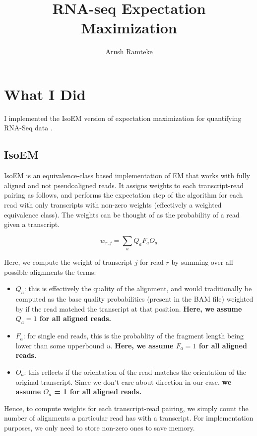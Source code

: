 \documentclass{article}
\title{RNA-seq Expectation Maximization}
\date{}
\author{Arush Ramteke}
\begin{document}
\maketitle

\section*{What I Did}

I implemented the IsoEM version of expectation maximization for quantifying RNA-Seq data \cite{nicolae}.

\subsection*{IsoEM}

IsoEM is an equivalence-class based implementation of EM that works with fully aligned and not pseudoaligned reads.
It assigns weights to each transcript-read pairing as follows, and performs the expectation step of the algorithm for each read with only transcripts with non-zero weights (effectively a weighted equivalence class). The weights can be thought of as the probability of a read given a transcript.

$$ w_{r,j} = \sum_{a}Q_aF_aO_a$$

Here, we compute the weight of transcript $j$ for read $r$ by summing over all possible alignments the terms:
\begin{itemize}
    \item{$Q_a$: this is effectively the quality of the alignment, and would traditionally be computed as the base quality probabilities (present in the BAM file) weighted by if the read matched the transcript at that position. \textbf{Here, we assume $Q_a = 1$ for all aligned reads.}}
    \item{$F_a$: for single end reads, this is the probablity of the fragment length being lower than some upperbound $u$. \textbf{Here, we assume $F_a = 1$ for all aligned reads.}}
    \item {$O_a$: this reflects if the orientation of the read matches the orientation of the original transcript. Since we don't care about direction in our case, \textbf{we assume $O_a$ = 1 for all aligned reads.}}
\end{itemize}

Hence, to compute weights for each transcript-read pairing, we simply count the number of alignments a particular read has with a transcript. For implementation purposes, we only need to store non-zero ones to save memory.
\end{document}
